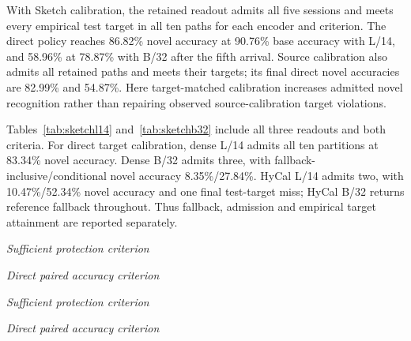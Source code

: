 \documentclass[preprint,review,12pt]{elsarticle}
\begin{document}
With Sketch calibration, the retained readout admits all five sessions and meets every empirical test target in all ten paths for each encoder and criterion. The direct policy reaches 86.82\% novel accuracy at 90.76\% base accuracy with L/14, and 58.96\% at 78.87\% with B/32 after the fifth arrival. Source calibration also admits all retained paths and meets their targets; its final direct novel accuracies are 82.99\% and 54.87\%. Here target-matched calibration increases admitted novel recognition rather than repairing observed source-calibration target violations.

Tables~\ref{tab:sketchl14} and~\ref{tab:sketchb32} include all three readouts and both criteria. For direct target calibration, dense L/14 admits all ten partitions at 83.34\% novel accuracy. Dense B/32 admits three, with fallback-inclusive/conditional novel accuracy 8.35\%/27.84\%. HyCal L/14 admits two, with 10.47\%/52.34\% novel accuracy and one final test-target miss; HyCal B/32 returns reference fallback throughout. Thus fallback, admission and empirical target attainment are reported separately.

\begin{table}[H]
\centering\setlength{\belowcaptionskip}{8pt}
\caption{L/14 natural-shift policies after arrival 5, first order. Finite counts admission and Met counts empirical target attainment out of ten partitions; Base/Novel are fallback-inclusive test means. Source/Sketch calibration receive identical class-wise counts. The common closed-base reference averages 93.77\% on Sketch.}
\label{tab:sketchl14}
{\small\textit{Sufficient protection criterion}\par\smallskip\par\medskip
\textit{Direct paired accuracy criterion}\par\smallskip}
\end{table}
\begin{table}[H]
\centering\setlength{\belowcaptionskip}{8pt}
\caption{B/32 natural-shift policies. Definitions match Table~\ref{tab:sketchl14}; the common closed-base reference averages 81.32\%.}
\label{tab:sketchb32}
{\small\textit{Sufficient protection criterion}\par\smallskip\par\medskip
\textit{Direct paired accuracy criterion}\par\smallskip}
\end{table}
\end{document}
